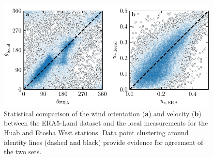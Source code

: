 \begin{figure}[p]
\centering
\includegraphics[scale=1]{Figures/Figure5_supp.pdf}
\caption{Statistical comparison of the wind orientation (\textbf{a}) and velocity (\textbf{b}) between the ERA5-Land dataset and the local measurements for the Huab and Etosha West stations. Data point clustering around identity lines (dashed and black) provide evidence for agreement of the two sets.}
\label{Fig5_supp}
\end{figure}

